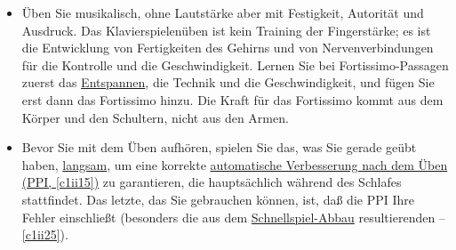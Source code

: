 \begin{itemize}
\item Üben Sie musikalisch, ohne Lautstärke aber mit Festigkeit, Autorität und Ausdruck.
Das Klavierspielenüben ist kein Training der Fingerstärke; es ist die Entwicklung von Fertigkeiten des Gehirns und von Nervenverbindungen für die Kontrolle und die Geschwindigkeit.
Lernen Sie bei Fortissimo-Passagen zuerst das \hyperref[c1ii14]{Entspannen}, die Technik und die Geschwindigkeit, und fügen Sie erst dann das Fortissimo hinzu.
Die Kraft für das Fortissimo kommt aus dem Körper und den Schultern, nicht aus den Armen.

\item Bevor Sie mit dem Üben aufhören, spielen Sie das, was Sie gerade geübt haben, \hyperref[c1ii17]{langsam}, um eine korrekte \hyperref[c1ii15]{automatische Verbesserung nach dem Üben (PPI, \autoref{c1ii15})} zu garantieren, die hauptsächlich während des Schlafes stattfindet.
Das letzte, das Sie gebrauchen können, ist, daß die PPI Ihre Fehler einschließt (besonders die aus dem \hyperref[fpd]{Schnellspiel-Abbau} resultierenden -- \autoref{c1ii25}).
\end{itemize}




